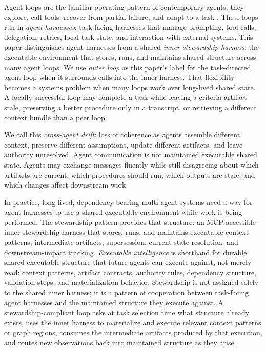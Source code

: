 \documentclass{article}
\begin{document}
Agent loops are the familiar operating pattern of contemporary agents: they explore, call tools, recover from partial failure, and adapt to a task \cite{yao2023react,schick2023toolformer,wu2023autogen,li2023camel,hong2023metagpt,wang2023voyager}. These loops run in \emph{agent harnesses}: task-facing harnesses that manage prompting, tool calls, delegation, retries, local task state, and interaction with external systems. This paper distinguishes agent harnesses from a shared \emph{inner stewardship harness}: the executable environment that stores, runs, and maintains shared structure across many agent loops. We use \emph{outer loop} as this paper's label for the task-directed agent loop when it surrounds calls into the inner harness. That flexibility becomes a systems problem when many loops work over long-lived shared state. A locally successful loop may complete a task while leaving a criteria artifact stale, preserving a better procedure only in a transcript, or retrieving a different context bundle than a peer loop.

We call this \emph{cross-agent drift}: loss of coherence as agents assemble different context, preserve different assumptions, update different artifacts, and leave authority unresolved. Agent communication is not maintained executable shared state. Agents may exchange messages fluently while still disagreeing about which artifacts are current, which procedures should run, which outputs are stale, and which changes affect downstream work.

In practice, long-lived, dependency-bearing multi-agent systems need a way for agent harnesses to use a shared executable environment while work is being performed. The stewardship pattern provides that structure: an MCP-accessible inner stewardship harness that stores, runs, and maintains executable context patterns, intermediate artifacts, supersession, current-state resolution, and downstream-impact tracking. \emph{Executable intelligence} is shorthand for durable shared executable structure that future agents can execute against, not merely read: context patterns, artifact contracts, authority rules, dependency structure, validation steps, and materialization behavior. Stewardship is not assigned solely to the shared inner harness; it is a pattern of cooperation between task-facing agent harnesses and the maintained structure they execute against. A stewardship-compliant loop asks at task selection time what structure already exists, uses the inner harness to materialize and execute relevant context patterns or graph regions, consumes the intermediate artifacts produced by that execution, and routes new observations back into maintained structure as they arise.
\end{document}
